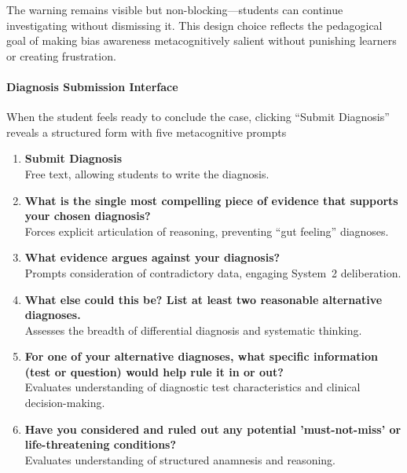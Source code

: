 The warning remains visible but non-blocking—students can continue investigating without dismissing it. This design choice reflects the pedagogical goal of making bias awareness metacognitively salient without punishing learners or creating frustration.

\paragraph{Diagnosis Submission Interface}

When the student feels ready to conclude the case, clicking ``Submit Diagnosis'' reveals a structured form with five metacognitive prompts

\begin{enumerate}
  \item \textbf{Submit Diagnosis} \\
  Free text, allowing students to write the diagnosis.
  \item \textbf{What is the single most compelling piece of evidence that supports your chosen diagnosis? } \\
  Forces explicit articulation of reasoning, preventing ``gut feeling'' diagnoses.
  \item \textbf{What evidence argues against your diagnosis?} \\
  Prompts consideration of contradictory data, engaging System~2 deliberation.
  \item \textbf{What else could this be? List at least two reasonable alternative diagnoses. } \\ 
  Assesses the breadth of differential diagnosis and systematic thinking. 
  \item \textbf{For one of your alternative diagnoses, what specific information (test or question) would help rule it in or out?} \\
  Evaluates understanding of diagnostic test characteristics and clinical decision-making.
  \item \textbf{Have you considered and ruled out any potential 'must-not-miss' or life-threatening conditions?} \\
  Evaluates understanding of structured anamnesis and reasoning.
\end{enumerate}


